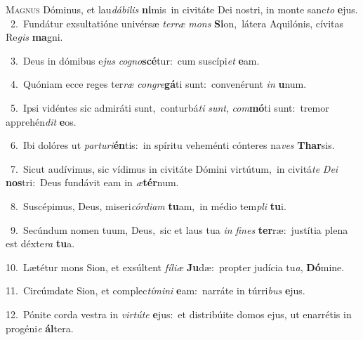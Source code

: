 \lettrine{\initial\textcolor{\initialcolor}{M}}{agnus} Dóminus, et lau\-\textit{dá}\-\textit{bi}\textit{lis} \textbf{ni}\-mis~\star in civitáte Dei nostri, in monte sanc\textit{to} \textbf{e}\-jus.\\
{\numbfont\textcolor{\numbcolor}{~2.}}~Fundátur exsultatióne univérsæ \textit{ter}\-\textit{ræ} \textit{mons} \textbf{Si}\-on,~\star látera Aquilónis, cívitas Re\textit{gis} \textbf{ma}\-gni.\par
{\numbfont\textcolor{\numbcolor}{~3.}}~Deus in dómibus e\textit{jus} \textit{co}\-\textit{gno}\textbf{scé}tur:~\star cum suscípi\textit{et} \textbf{e}\-am.\par
{\numbfont\textcolor{\numbcolor}{~4.}}~Quóniam ecce reges ter\textit{ræ} \textit{con}\-\textit{gre}\textbf{gá}ti sunt:~\star convenérunt \textit{in} \textbf{u}\-num.\par
{\numbfont\textcolor{\numbcolor}{~5.}}~Ipsi vidéntes sic admiráti sunt,~\dagger conturbá\textit{ti} \textit{sunt}\-, \textit{com}\-\textbf{mó}ti sunt:~\star tremor apprehén\textit{dit} \textbf{e}\-os.\par
{\numbfont\textcolor{\numbcolor}{~6.}}~Ibi dolóres ut \textit{par}\-\textit{tu}\textit{ri}\textbf{én}tis:~\star in spíritu veheménti cónteres na\textit{ves} \textbf{Thar}\-sis.\par
{\numbfont\textcolor{\numbcolor}{~7.}}~Sicut audívimus, sic vídimus in civitáte Dómini virtútum,~\dagger in civitá\textit{te} \textit{De}\-\textit{i} \textbf{nos}\-tri:~\star Deus fundávit eam in \textit{æ}\-\textbf{tér}num.\par
{\numbfont\textcolor{\numbcolor}{~8.}}~Suscépimus, Deus, miseri\-\textit{cór}\-\textit{di}\textit{am} \textbf{tu}\-am,~\star in médio tem\textit{pli} \textbf{tu}\-i.\par
{\numbfont\textcolor{\numbcolor}{~9.}}~Secúndum nomen tuum, Deus,~\dagger sic et laus tua \textit{in} \textit{fi}\-\textit{nes} \textbf{ter}\-ræ:~\star justítia plena est déxte\textit{ra} \textbf{tu}\-a.\par
{\numbfont\textcolor{\numbcolor}{10.}}~Lætétur mons Sion, et exsúltent \textit{fí}\-\textit{li}\textit{æ} \textbf{Ju}\-dæ:~\star propter judícia tu\-\textit{a}\-, \textbf{Dó}\-mine.\par
{\numbfont\textcolor{\numbcolor}{11.}}~Circúmdate Sion, et complec\-\textit{tí}\-\textit{mi}\textit{ni} \textbf{e}\-am:~\star narráte in túrri\textit{bus} \textbf{e}\-jus.\par
{\numbfont\textcolor{\numbcolor}{12.}}~Pónite corda vestra in \textit{vir}\-\textit{tú}\textit{te} \textbf{e}\-jus:~\star et distribúite domos ejus, ut enarrétis in progéni\textit{e} \textbf{ál}\-tera.\par
